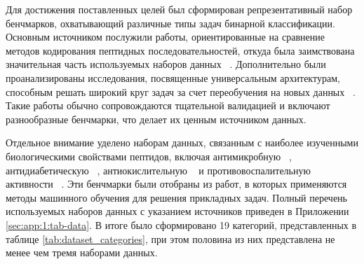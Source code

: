 \documentclass[specification,annotation,times]{itmo-student-thesis}
\begin{document}
Для достижения поставленных целей был сформирован репрезентативный набор бенчмарков, охватывающий различные типы задач бинарной классификации. Основным источником послужили работы, ориентированные на сравнение методов кодирования пептидных последовательностей, откуда была заимствована значительная часть используемых наборов данных ~\cite{spanig2021large}. Дополнительно были проанализированы исследования, посвященные универсальным архитектурам, способным решать широкий круг задач за счет переобучения на новых данных ~\cite{du2023unidl4biopep}. Такие работы обычно сопровождаются тщательной валидацией и включают разнообразные бенчмарки, что делает их ценным источником данных.

Отдельное внимание уделено наборам данных, связанным с наиболее изученными биологическими свойствами пептидов, включая антимикробную ~\cite{cao2023designing}, антидиабетическую ~\cite{chen2022antidmppred}, антиокислительную ~\cite{qin2023prediction} и противовоспалительную активности ~\cite{raza2023aips}. 
Эти бенчмарки были отобраны из работ, в которых применяются методы машинного обучения для решения прикладных задач. 
Полный перечень используемых наборов данных с указанием источников приведен в Приложении \ref{sec:app:1:tab-data}. 
В итоге было сформировано 19 категорий, представленных в таблице \ref{tab:dataset_categories}, при этом половина из них представлена не менее чем тремя наборами данных.
\end{document}
